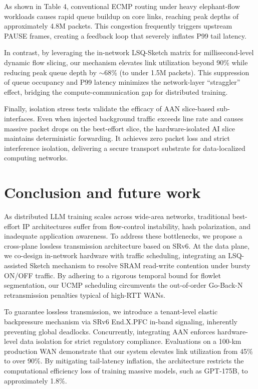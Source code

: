 \documentclass[a4paper]{jpconf}
\begin{document}
As shown in Table 4, conventional ECMP routing under heavy elephant-flow workloads causes rapid queue buildup on core links, reaching peak depths of approximately 4.8M packets. This congestion frequently triggers upstream PAUSE frames, creating a feedback loop that severely inflates P99 tail latency.


In contrast, by leveraging the in-network LSQ-Sketch matrix for millisecond-level dynamic flow slicing, our mechanism elevates link utilization beyond 90\% while reducing peak queue depth by $\sim$68\% (to under 1.5M packets). This suppression of queue occupancy and P99 latency minimizes the network-layer ``straggler'' effect, bridging the compute-communication gap for distributed training.


Finally, isolation stress tests validate the efficacy of AAN slice-based sub-interfaces. Even when injected background traffic exceeds line rate and causes massive packet drops on the best-effort slice, the hardware-isolated AI slice maintains deterministic forwarding. It achieves zero packet loss and strict interference isolation, delivering a secure transport substrate for data-localized computing networks.


\section{Conclusion and future work}


As distributed LLM training scales across wide-area networks, traditional best-effort IP architectures suffer from flow-control instability, hash polarization, and inadequate application awareness. To address these bottlenecks, we propose a cross-plane lossless transmission architecture based on SRv6. At the data plane, we co-design in-network hardware with traffic scheduling, integrating an LSQ-assisted Sketch mechanism to resolve SRAM read-write contention under bursty ON/OFF traffic. By adhering to a rigorous temporal bound for flowlet segmentation, our UCMP scheduling circumvents the out-of-order Go-Back-N retransmission penalties typical of high-RTT WANs.


To guarantee lossless transmission, we introduce a tenant-level elastic backpressure mechanism via SRv6 End.X.PFC in-band signaling, inherently preventing global deadlocks. Concurrently, integrating AAN enforces hardware-level data isolation for strict regulatory compliance. Evaluations on a 100-km production WAN demonstrate that our system elevates link utilization from 45\% to over 90\%. By mitigating tail-latency inflation, the architecture restricts the computational efficiency loss of training massive models, such as GPT-175B, to approximately 1.8\%.
\end{document}
